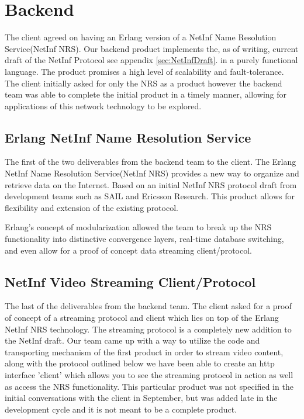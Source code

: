 \section {Backend}

The client agreed on having an Erlang version of a NetInf Name Resolution Service(NetInf NRS).  Our backend product implements the, as of writing, current draft of the NetInf Protocol see appendix  \ref{sec:NetInfDraft}.  in a purely functional language. The product promises a high level of scalability and fault-tolerance. The client initially asked for only the NRS as a product however the backend team was able to complete the initial product in a timely manner, allowing for applications of this network technology to be explored. 


\subsection {Erlang NetInf Name Resolution Service}
The first of the two deliverables from the backend team to the client. The Erlang NetInf Name Resolution Service(NetInf NRS) provides a new way to organize and retrieve data on the Internet. Based on an initial NetInf NRS protocol draft from development teams such as SAIL and Ericsson Research. This product allows for flexibility and extension of the existing protocol.

Erlang's concept of modularization allowed the team to break up the NRS functionality into distinctive convergence layers, real-time database switching, and even allow for a proof of concept data streaming client/protocol. 

\subsection{NetInf Video Streaming Client/Protocol}

The last of the deliverables from the backend team. The client asked for a proof of concept of a streaming protocol and client which lies on top of the Erlang NetInf NRS technology. The streaming protocol is a completely new addition to the NetInf draft. Our team came up with a way to utilize the code and transporting mechanism of the first product in order to stream video content, along with the protocol outlined below we have been able to create an http interface 'client' which allows you to see the streaming protocol in action as well as access the NRS functionality. This particular product was not specified in the initial conversations with the client in September, but was added late in the development cycle and it is not meant to be a complete product.

